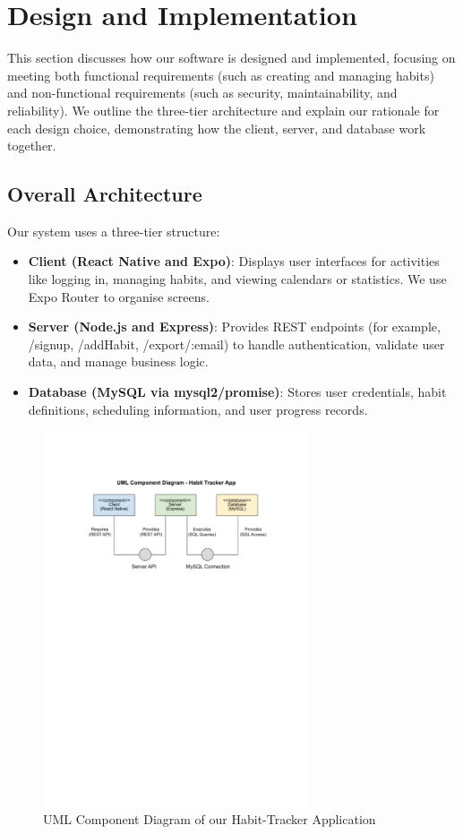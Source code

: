 \section{Design and Implementation}

This section discusses how our software is designed and implemented, focusing on meeting both functional requirements (such as creating and managing habits) and non-functional requirements (such as security, maintainability, and reliability). We outline the three-tier architecture and explain our rationale for each design choice, demonstrating how the client, server, and database work together.

\subsection{Overall Architecture}

Our system uses a three-tier structure: \begin{itemize} \item \textbf{Client (React Native and Expo)}:
Displays user interfaces for activities like logging in, managing habits, and viewing calendars or statistics. We use Expo Router to organise screens.
\item \textbf{Server (Node.js and Express)}:
Provides REST endpoints (for example, /signup, /addHabit, /export/:email) to handle authentication, validate user data, and manage business logic.
\item \textbf{Database (MySQL via mysql2/promise)}:
Stores user credentials, habit definitions, scheduling information, and user progress records. \end{itemize}

\begin{figure}[H]
    \centering
    \includegraphics[width=0.7\textwidth]{resources/component.pdf}
    \caption{UML Component Diagram of our Habit-Tracker Application}
    \label{fig:component_diagram}
\end{figure}

